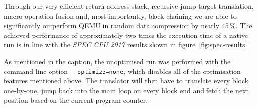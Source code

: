 Through our very efficient return address stack, recursive jump target translation, macro operation fusion and, most importantly, block chaining we are able to significantly outperform QEMU in random data compression by nearly 45\,\%.
The achieved performance of approximately two times the execution time of a native run is in line with the \textit{SPEC CPU 2017} results shown in figure~\ref{fig:spec-results}.

As mentioned in the caption, the unoptimised run was performed with the command line option \texttt{----optimize=none}, which disables all of the optimisation features mentioned above.
The translator will then have to translate every block one-by-one, jump back into the main loop on every block end and fetch the next position based on the current program counter.






















